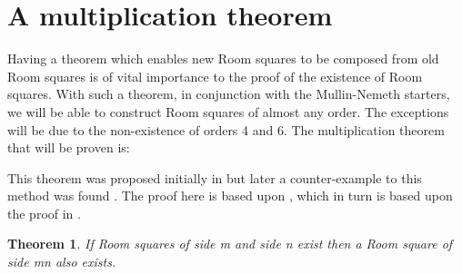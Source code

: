 \documentclass[
  11pt,
  a4paper]{book}
\newtheorem{theorem}{Theorem}
\begin{document}
\hypertarget{a-multiplication-theorem}{%
\section{A multiplication theorem}\label{a-multiplication-theorem}}

Having a theorem which enables new Room squares to be
composed from old Room squares is of vital importance to the
proof of the existence of Room squares. With such a theorem,
in conjunction with the Mullin-Nemeth starters, we will be
able to construct Room squares of almost any order. The
exceptions will be due to the non-existence of orders 4 and
6. The multiplication theorem that will be proven is:

This theorem was proposed initially in
\textcite{bruck_what_1963}
but later a
counter-example to this method was found
\textcite{mullin_counterexample_1969}.
The proof
here is based upon
\textcite{anderson_combinatorial_1990},
which in turn is based upon the proof in
\textcite{stanton_multiplication_1972}.

\begin{theorem}
\label{thm:multiply}
If Room squares of side m and side n exist then a Room
square of side mn also exists.
\end{theorem}
\end{document}
